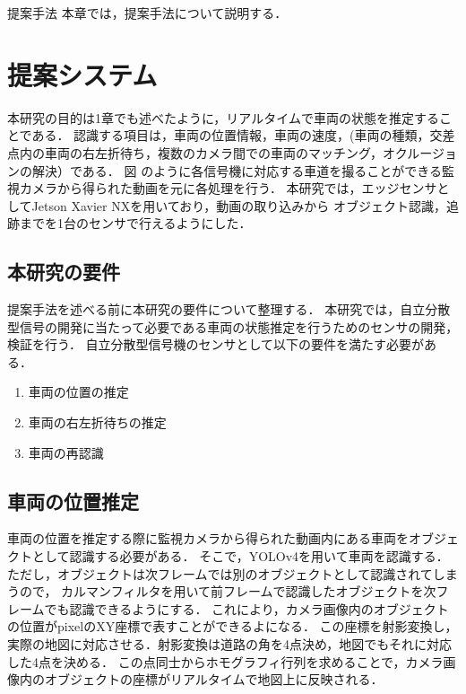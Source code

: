 \chapterhead
{提案手法}
{本章では，提案手法について説明する．}



\section{提案システム}%
本研究の目的は1章でも述べたように，リアルタイムで車両の状態を推定することである．%
認識する項目は，車両の位置情報，車両の速度，(車両の種類，交差点内の車両の右左折待ち，複数のカメラ間での車両のマッチング，オクルージョンの解決）である．%
図 のように各信号機に対応する車道を撮ることができる監視カメラから得られた動画を元に各処理を行う．%
本研究では，エッジセンサとしてJetson Xavier NX\cite{jetson}を用いており，動画の取り込みから
オブジェクト認識，追跡までを1台のセンサで行えるようにした．

\subsection{本研究の要件}
提案手法を述べる前に本研究の要件について整理する．
本研究では，自立分散型信号の開発に当たって必要である車両の状態推定を行うためのセンサの開発，検証を行う．
自立分散型信号機のセンサとして以下の要件を満たす必要がある．

\begin{enumerate}
	\item 車両の位置の推定
	\item 車両の右左折待ちの推定
	\item 車両の再認識
\end{enumerate}


\subsection{車両の位置推定}
車両の位置を推定する際に監視カメラから得られた動画内にある車両をオブジェクトとして認識する必要がある．
そこで，YOLOv4\cite{bochkovskiy2020yolov4}を用いて車両を認識する．
ただし，オブジェクトは次フレームでは別のオブジェクトとして認識されてしまうので，
カルマンフィルタを用いて前フレームで認識したオブジェクトを次フレームでも認識できるようにする．
これにより，カメラ画像内のオブジェクトの位置がpixelのXY座標で表すことができるよになる．
この座標を射影変換し，実際の地図に対応させる．射影変換は道路の角を4点決め，地図でもそれに対応した4点を決める．
この点同士からホモグラフィ行列を求めることで，カメラ画像内のオブジェクトの座標がリアルタイムで地図上に反映される．

